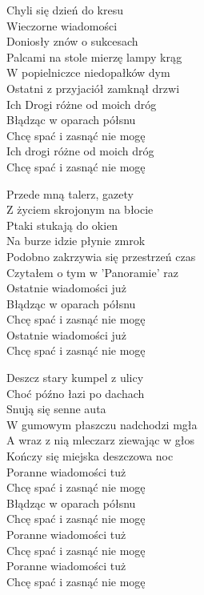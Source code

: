 
\begin{text}
    Chyli się dzień do kresu\\
    Wieczorne wiadomości\\
    Doniosły znów o sukcesach\\
    Palcami na stole mierzę lampy krąg\\
    W popielniczce niedopałków dym\\
    Ostatni z przyjaciół zamknął drzwi\\
    Ich Drogi różne od moich dróg\\
    Błądząc w oparach półsnu\\
    Chcę spać i zasnąć nie mogę\\
    Ich drogi różne od moich dróg\\
    Chcę spać i zasnąć nie mogę

    Przede mną talerz, gazety\\
    Z życiem skrojonym na błocie\\
    Ptaki stukają do okien\\
    Na burze idzie płynie zmrok\\
    Podobno zakrzywia się przestrzeń czas\\
    Czytałem o tym w 'Panoramie' raz\\
    Ostatnie wiadomości już\\
    Błądząc w oparach półsnu\\
    Chcę spać i zasnąć nie mogę\\
    Ostatnie wiadomości już\\
    Chcę spać i zasnąć nie mogę

    Deszcz stary kumpel z ulicy\\
    Choć późno łazi po dachach\\
    Snują się senne auta\\
    W gumowym płaszczu nadchodzi mgła\\
    A wraz z nią mleczarz ziewając w głos\\
    Kończy się miejska deszczowa noc\\
    Poranne wiadomości tuż\\
    Chcę spać i zasnąć nie mogę\\
    Błądząc w oparach półsnu\\
    Chcę spać i zasnąć nie mogę\\
    Poranne wiadomości tuż\\
    Chcę spać i zasnąć nie mogę\\
    Poranne wiadomości tuż\\
    Chcę spać i zasnąć nie mogę
\end{text}
\begin{chord}

\end{chord}
